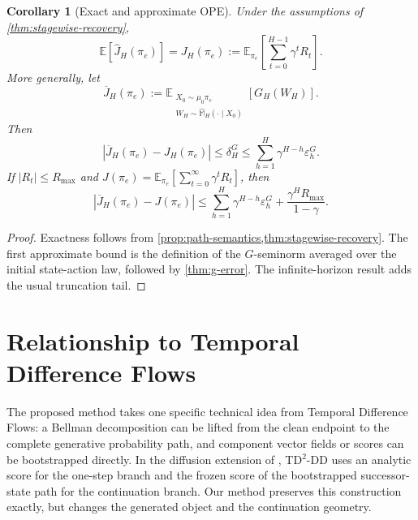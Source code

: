 \documentclass[11pt]{article}
\newtheorem{corollary}[theorem]{Corollary}
\theoremstyle{definition}
\theoremstyle{remark}
\newcommand{\E}{\mathbb E}
\newcommand{\targetpi}{\pi_e}
\begin{document}
\begin{corollary}[Exact and approximate OPE]
\label{cor:ope}
Under the assumptions of \cref{thm:stagewise-recovery},
\begin{equation}
\E[\widehat J_H(\targetpi)]
=
J_H(\targetpi)
:=
\E_{\targetpi}
\left[
\sum_{t=0}^{H-1}\gamma^tR_t
\right].
\label{eq:exact-ope}
\end{equation}
More generally, let
\begin{equation}
\overline J_H(\targetpi)
:=
\E_{\substack{
X_0\sim\mu_0\targetpi\\
W_H\sim\widehat{\mathbb M}_H(\cdot\mid X_0)
}}
[G_H(W_H)].
\end{equation}
Then
\begin{equation}
\boxed{
|\overline J_H(\targetpi)-J_H(\targetpi)|
\leq
\delta_H^G
\leq
\sum_{h=1}^{H}\gamma^{H-h}\varepsilon_h^G.
}
\label{eq:approx-ope}
\end{equation}
If $|R_t|\leq R_{\max}$ and
$J(\targetpi)=\E_{\targetpi}[\sum_{t=0}^{\infty}\gamma^tR_t]$, then
\begin{equation}
\boxed{
|\overline J_H(\targetpi)-J(\targetpi)|
\leq
\sum_{h=1}^{H}\gamma^{H-h}\varepsilon_h^G
+
\frac{\gamma^H R_{\max}}{1-\gamma}.
}
\label{eq:infinite-ope}
\end{equation}
\end{corollary}

\begin{proof}
Exactness follows from \cref{prop:path-semantics,thm:stagewise-recovery}.
The first approximate bound is the definition of the $G$-seminorm averaged
over the initial state-action law, followed by \cref{thm:g-error}. The
infinite-horizon result adds the usual truncation tail.
\end{proof}

\section{Relationship to Temporal Difference Flows}
\label{sec:relationship}

The proposed method takes one specific technical idea from Temporal Difference
Flows: a Bellman decomposition can be lifted from the clean endpoint to the
complete generative probability path, and component vector fields or scores can
be bootstrapped directly. In the diffusion extension of
\citet{farebrother2025tdflow}, TD$^2$-DD uses an analytic score for the
one-step branch and the frozen score of the bootstrapped successor-state path
for the continuation branch. Our method preserves this construction exactly,
but changes the generated object and the continuation geometry.
\end{document}
